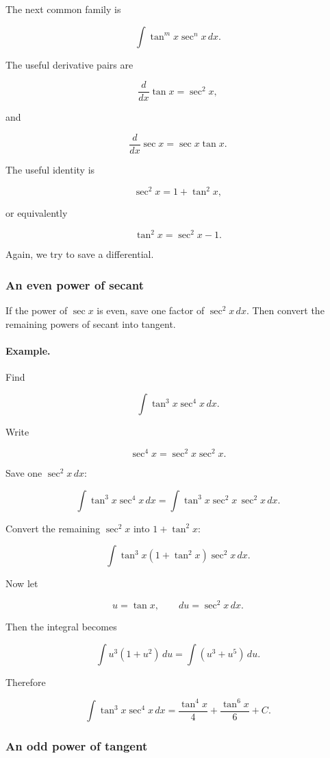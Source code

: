 The next common family is

\[
\int \tan^m x\sec^n x\,dx.
\]

The useful derivative pairs are

\[
\frac{d}{dx}\tan x=\sec^2 x,
\]

and

\[
\frac{d}{dx}\sec x=\sec x\tan x.
\]

The useful identity is

\[
\sec^2 x=1+\tan^2 x,
\]

or equivalently

\[
\tan^2 x=\sec^2 x-1.
\]

Again, we try to save a differential.

\subsubsection*{An even power of secant}

If the power of \(\sec x\) is even, save one factor of \(\sec^2 x\,dx\).  Then convert the
remaining powers of secant into tangent.

\paragraph{Example.}
Find

\[
\int \tan^3 x\sec^4 x\,dx.
\]

Write

\[
\sec^4 x=\sec^2 x\sec^2 x.
\]

Save one \(\sec^2 x\,dx\):

\[
\int \tan^3 x\sec^4 x\,dx
=
\int \tan^3 x\sec^2 x\,\sec^2 x\,dx.
\]

Convert the remaining \(\sec^2 x\) into \(1+\tan^2 x\):

\[
\int \tan^3 x(1+\tan^2 x)\sec^2 x\,dx.
\]

Now let

\[
u=\tan x,
\qquad
du=\sec^2 x\,dx.
\]

Then the integral becomes

\[
\int u^3(1+u^2)\,du
=
\int (u^3+u^5)\,du.
\]

Therefore

\[
\boxed{
\int \tan^3 x\sec^4 x\,dx
=
\frac{\tan^4 x}{4}+\frac{\tan^6 x}{6}+C.
}
\]

\subsubsection*{An odd power of tangent}


